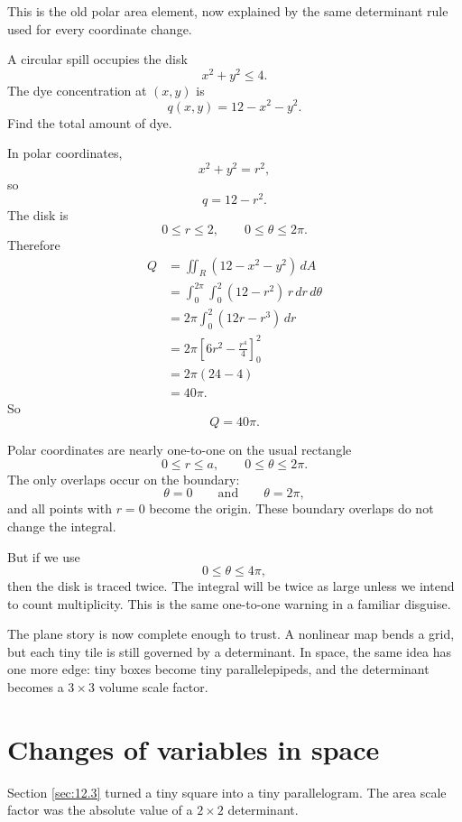 This is the old polar area element, now explained by the same determinant rule used
for every coordinate change.

\begin{example}
A circular spill occupies the disk
\[
    x^2+y^2\le4.
\]
The dye concentration at \((x,y)\) is
\[
    q(x,y)=12-x^2-y^2.
\]
Find the total amount of dye.

In polar coordinates,
\[
    x^2+y^2=r^2,
\]
so
\[
    q=12-r^2.
\]
The disk is
\[
    0\le r\le2,\qquad 0\le\theta\le2\pi.
\]
Therefore
\[
\begin{aligned}
    Q
    &=
    \iint_R (12-x^2-y^2)\,dA\\
    &=
    \int_0^{2\pi}\int_0^2 (12-r^2)\,r\,dr\,d\theta\\
    &=
    2\pi\int_0^2(12r-r^3)\,dr\\
    &=
    2\pi
    \left[
        6r^2-\frac{r^4}{4}
    \right]_0^2\\
    &=
    2\pi(24-4)\\
    &=
    40\pi.
\end{aligned}
\]
So
\[
\boxed{
    Q=40\pi.
}
\]
\end{example}

Polar coordinates are nearly one-to-one on the usual rectangle
\[
    0\le r\le a,\qquad 0\le\theta\le2\pi.
\]
The only overlaps occur on the boundary:
\[
    \theta=0
    \qquad\text{and}\qquad
    \theta=2\pi,
\]
and all points with \(r=0\) become the origin.  These boundary overlaps do not change
the integral.

But if we use
\[
    0\le\theta\le4\pi,
\]
then the disk is traced twice.  The integral will be twice as large unless we intend to
count multiplicity.  This is the same one-to-one warning in a familiar disguise.

The plane story is now complete enough to trust.  A nonlinear map bends a grid, but
each tiny tile is still governed by a determinant.  In space, the same idea has one more
edge: tiny boxes become tiny parallelepipeds, and the determinant becomes a
\(3\times3\) volume scale factor.

\section{Changes of variables in space}
\label{sec:12.4}

Section \ref{sec:12.3} turned a tiny square into a tiny parallelogram.  The area scale
factor was the absolute value of a \(2\times2\) determinant.

